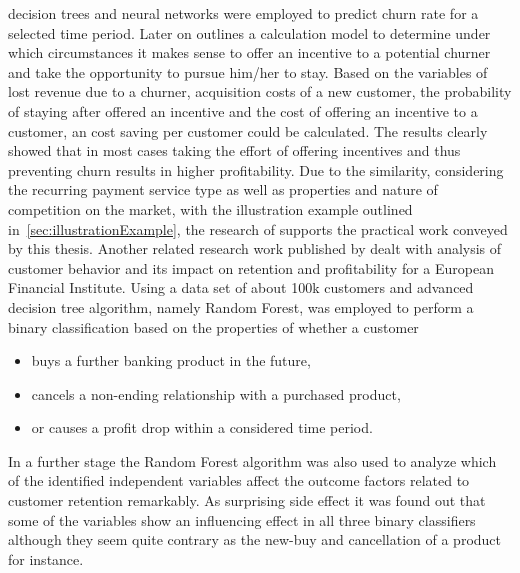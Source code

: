 decision trees and neural networks were employed to predict churn rate for a selected time period. Later on \cite{mozer2000predicting} outlines a calculation model to determine under which circumstances it makes sense to offer an incentive to a potential churner and take the opportunity to pursue him/her to stay. Based on the variables of lost revenue due to a churner, acquisition costs of a new customer, the probability of staying after offered an incentive and the cost of offering an incentive to a customer, an cost saving per customer could be calculated. The results clearly showed that in most cases taking the effort of offering incentives and thus preventing churn results in higher profitability. Due to the similarity, considering the recurring payment service type as well as properties and nature of competition on the market, with the illustration example outlined in~\ref{sec:illustrationExample}, the research of \cite{mozer2000predicting} supports the practical work conveyed by this thesis. Another related research work published by \cite{lariviere2005predicting} dealt with analysis of customer behavior and its impact on retention and profitability for a European Financial Institute. Using a data set of about 100k customers and advanced decision tree algorithm, namely Random Forest, was employed to perform a binary classification based on the properties of whether a customer

\begin{itemize}
	\item buys a further banking product in the future,
	\item cancels a non-ending relationship with a purchased product,
	\item or causes a profit drop within a considered time period.
\end{itemize}

In a further stage the Random Forest algorithm was also used to analyze which of the identified independent variables affect the outcome factors related to customer retention remarkably. As surprising side effect it was found out that some of the variables show an influencing effect in all three binary classifiers although they seem quite contrary as the new-buy and cancellation of a product for instance. 

